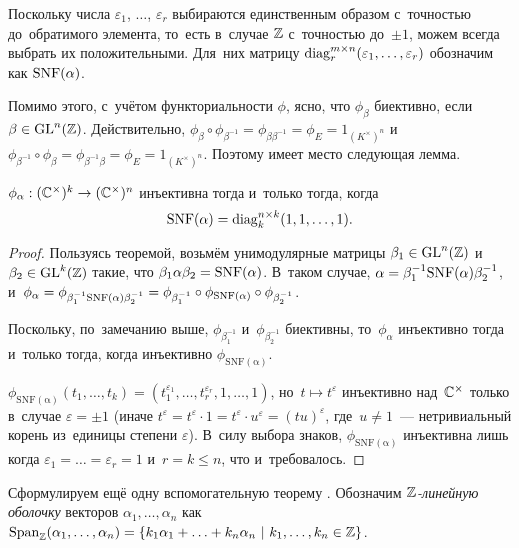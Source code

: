 \documentclass{article}
\begin{document}
Поскольку числа $\varepsilon_1$, $\ldots$, $\varepsilon_r$ выбираются единственным образом с~точностью
до~обратимого элемента, то~есть в~случае $\mathbb{Z}$ с~точностью до~$\pm 1$, можем всегда выбрать их положительными.
Для~них матрицу $\mathrm{diag}^{m \times n}_r(\varepsilon_1, \ldots, \varepsilon_r)$ обозначим как $\mathrm{SNF}(\alpha)$.

Помимо этого, с~учётом функториальности $\phi$, ясно, что $\phi_\beta$ биективно, если $\beta \in \mathrm{GL}^n(\mathbb{Z})$.
Действительно, $\phi_\beta \circ \phi_{\beta^{-1}} = \phi_{\beta \beta^{-1}} = \phi_E = 1_{(K^\times)^n}$
и~$\phi_{\beta^{-1}} \circ \phi_\beta = \phi_{\beta^{-1} \beta} = \phi_E = 1_{(K^\times)^n}$.
Поэтому имеет место следующая лемма.

\begin{lemma}
\label{lemma:injectivityOutOfSNF}
    $\phi_\alpha : (\mathbb{C}^\times)^k \rightarrow (\mathbb{C}^\times)^n$ инъективна тогда и~только тогда, когда
    $$
        \mathrm{SNF}(\alpha) = \mathrm{diag}^{n \times k}_k(1, 1, \ldots, 1).
    $$
\end{lemma}

\begin{proof}
    Пользуясь теоремой, возьмём унимодулярные матрицы $\beta_1 \in \mathrm{GL}^n(\mathbb{Z})$ и~$\beta_2 \in \mathrm{GL}^k(\mathbb{Z})$
    такие, что $\beta_1 \alpha \beta_2 = \mathrm{SNF}(\alpha)$.
    В~таком случае, $\alpha = \beta_1^{-1} \mathrm{SNF}(\alpha) \beta_2^{-1}$, и~$\phi_\alpha = \phi_{\beta_1^{-1} \mathrm{SNF}(\alpha) \beta_2^{-1}}
                                                                                      = \phi_{\beta_1^{-1}} \circ \phi_{\mathrm{SNF}(\alpha)} \circ \phi_{\beta_2^{-1}}$.

    Поскольку, по~замечанию выше, $\phi_{\beta_1^{-1}}$ и~$\phi_{\beta_2^{-1}}$ биективны, то~$\phi_\alpha$
    инъективно тогда и~только тогда, когда инъективно $\phi_{\mathrm{SNF(\alpha)}}$.

    $\phi_{\mathrm{SNF(\alpha)}}(t_1, \ldots, t_k) = (t_1^{\varepsilon_1}, \ldots, t_r^{\varepsilon_r}, 1, \ldots, 1)$,
    но~$t \mapsto t^\varepsilon$ инъективно над~$\mathbb{C}^\times$ только в~случае $\varepsilon = \pm 1$
    (иначе $t^\varepsilon = t^\varepsilon \cdot 1 = t^\varepsilon \cdot u^\varepsilon = (tu)^\varepsilon$,
     где~$u \neq 1$~— нетривиальный корень из~единицы степени $\varepsilon$).
    В~силу выбора знаков, $\phi_{\mathrm{SNF(\alpha)}}$ инъективна лишь когда $\varepsilon_1 = \ldots = \varepsilon_r = 1$
    и~$r = k \leq n$, что и~требовалось.
\end{proof}

Сформулируем ещё одну вспомогательную теорему \cite{TsikhSad14}.
Обозначим \textit{$\mathbb{Z}$-линейную оболочку} векторов $\alpha_1, \ldots, \alpha_n$ как
$\mathrm{Span}_{\mathbb{Z}}(\alpha_1, \ldots, \alpha_n) = \{ k_1 \alpha_1 + \ldots + k_n \alpha_n \ | \ k_1, \ldots, k_n \in \mathbb{Z} \}$.
\end{document}
